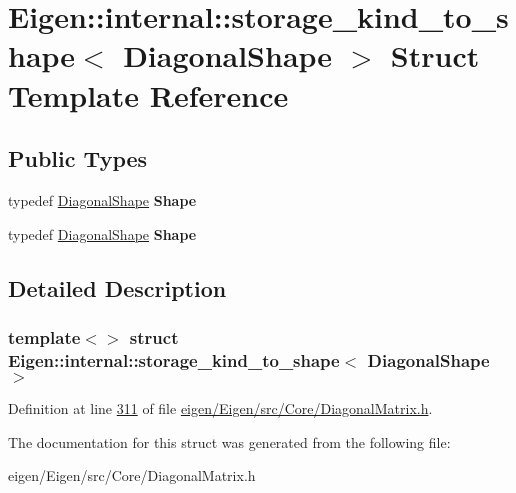 \hypertarget{struct_eigen_1_1internal_1_1storage__kind__to__shape_3_01_diagonal_shape_01_4}{}\section{Eigen\+:\+:internal\+:\+:storage\+\_\+kind\+\_\+to\+\_\+shape$<$ Diagonal\+Shape $>$ Struct Template Reference}
\label{struct_eigen_1_1internal_1_1storage__kind__to__shape_3_01_diagonal_shape_01_4}
\subsection*{Public Types}
\begin{DoxyCompactItemize}
\item 
\mbox{\label{struct_eigen_1_1internal_1_1storage__kind__to__shape_3_01_diagonal_shape_01_4_a1f2f5c3952c7b90d86a2039e6c5cd8dc}} 
typedef \hyperlink{struct_eigen_1_1_diagonal_shape}{Diagonal\+Shape} {\bfseries Shape}
\item 
\mbox{\label{struct_eigen_1_1internal_1_1storage__kind__to__shape_3_01_diagonal_shape_01_4_a1f2f5c3952c7b90d86a2039e6c5cd8dc}} 
typedef \hyperlink{struct_eigen_1_1_diagonal_shape}{Diagonal\+Shape} {\bfseries Shape}
\end{DoxyCompactItemize}


\subsection{Detailed Description}
\subsubsection*{template$<$$>$\newline
struct Eigen\+::internal\+::storage\+\_\+kind\+\_\+to\+\_\+shape$<$ Diagonal\+Shape $>$}



Definition at line \hyperlink{eigen_2_eigen_2src_2_core_2_diagonal_matrix_8h_source_l00311}{311} of file \hyperlink{eigen_2_eigen_2src_2_core_2_diagonal_matrix_8h_source}{eigen/\+Eigen/src/\+Core/\+Diagonal\+Matrix.\+h}.



The documentation for this struct was generated from the following file\+:\begin{DoxyCompactItemize}
\item 
eigen/\+Eigen/src/\+Core/\+Diagonal\+Matrix.\+h\end{DoxyCompactItemize}
